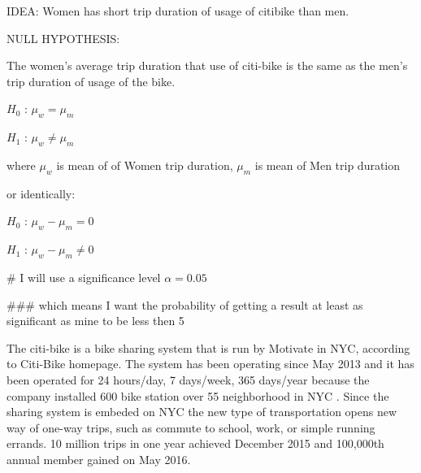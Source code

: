IDEA:
Women has short trip duration of usage of citibike than men.

NULL HYPOTHESIS:

The women's average trip duration that use of citi-bike is the same as the men's trip duration of usage of the bike.


$H_0$ : $\mu_w  = \mu_m $ 

$H_1$ : $\mu_w  \neq \mu_m $ 

where $\mu_w$ is mean of of Women trip duration, $\mu_m$ is mean of Men trip duration

or identically:

$H_0$ : $\mu_w - \mu_m   = 0 $

$H_1$ : $\mu_w  - \mu_m   \neq 0 $

# I will use a significance level  $\alpha=0.05$

### which means I want the probability of getting a result at least as significant as mine to be less then 5%


The citi-bike is a bike sharing system that is run by Motivate in NYC, according to Citi-Bike homepage\cite{nyc}. The system has been operating since May 2013 and it has been operated for 24 hours/day, 7 days/week, 365 days/year because the company installed 600 bike station over 55 neighborhood in NYC \cite{nyc}. Since the sharing system is embeded on NYC the new type of transportation opens new way of one-way trips, such as commute to school, work, or simple running errands. 10 million trips in one year achieved December 2015 and 100,000th annual member gained on May 2016\cite{nyc}.


